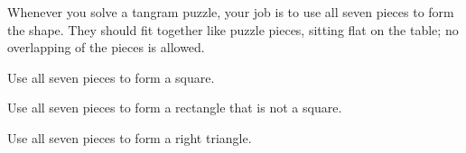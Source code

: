 \newpage

Whenever you solve a tangram puzzle, your job is to use all seven pieces to form the shape.  They should fit together like puzzle pieces, sitting flat on the table; no overlapping of the pieces is allowed.

\begin{problem}\label{prob:tangramsquare}
Use all seven pieces to form a square.
\end{problem}

\bigskip

\begin{problem}
Use all seven pieces to form a rectangle that is not a square.
\end{problem}

\bigskip

\begin{problem}
Use all seven pieces to form a right triangle.
\end{problem}

\bigskip

